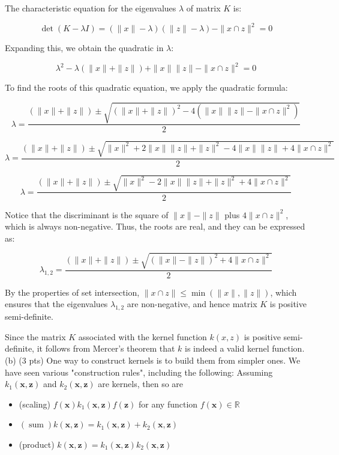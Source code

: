 \documentclass[10pt]{article}
\begin{document}
The characteristic equation for the eigenvalues $\lambda$ of matrix $K$ is:

\[
\det(K - \lambda I) = (\| x \| - \lambda)(\| z \| - \lambda) - \| x \cap z \|^2 = 0
\]

Expanding this, we obtain the quadratic in $\lambda$:

\[
\lambda^2 - \lambda(\| x \| + \| z \|) + \| x \|\| z \| - \| x \cap z \|^2 = 0
\]

To find the roots of this quadratic equation, we apply the quadratic formula:

\[
\lambda = \frac{(\| x \| + \| z \|) \pm \sqrt{(\| x \| + \| z \|)^2 - 4(\| x \|\| z \| - \| x \cap z \|^2)}}{2}
\]

\[
\lambda = \frac{(\| x \| + \| z \|) \pm \sqrt{\| x \|^2 + 2\| x \|\| z \| + \| z \|^2 - 4\| x \|\| z \| + 4\| x \cap z \|^2}}{2}
\]

\[
\lambda = \frac{(\| x \| + \| z \|) \pm \sqrt{\| x \|^2 - 2\| x \|\| z \| + \| z \|^2 + 4\| x \cap z \|^2}}{2}
\]

Notice that the discriminant is the square of $\| x \| - \| z \|$ plus $4\| x \cap z \|^2$, which is always non-negative. Thus, the roots are real, and they can be expressed as:

\[
\lambda_{1,2} = \frac{(\| x \| + \| z \|) \pm \sqrt{(\| x \| - \| z \|)^2 + 4\| x \cap z \|^2}}{2}
\]

By the properties of set intersection, $\| x \cap z \| \leq \min(\| x \|, \| z \|)$, which ensures that the eigenvalues $\lambda_{1,2}$ are non-negative, and hence matrix $K$ is positive semi-definite.

Since the matrix $K$ associated with the kernel function $k(x, z)$ is positive semi-definite, it follows from Mercer's theorem that $k$ is indeed a valid kernel function. \\

(b) (3 pts) One way to construct kernels is to build them from simpler ones. We have seen various "construction rules", including the following: Assuming $k_{1}(\boldsymbol{x}, \boldsymbol{z})$ and $k_{2}(\boldsymbol{x}, \boldsymbol{z})$ are kernels, then so are

\begin{itemize}
  \item (scaling) $f(\boldsymbol{x}) k_{1}(\boldsymbol{x}, \boldsymbol{z}) f(\boldsymbol{z})$ for any function $f(\boldsymbol{x}) \in \mathbb{R}$
  \item $(\operatorname{sum}) k(\boldsymbol{x}, \boldsymbol{z})=k_{1}(\boldsymbol{x}, \boldsymbol{z})+k_{2}(\boldsymbol{x}, \boldsymbol{z})$
  \item (product) $k(\boldsymbol{x}, \boldsymbol{z})=k_{1}(\boldsymbol{x}, \boldsymbol{z}) k_{2}(\boldsymbol{x}, \boldsymbol{z})$
\end{itemize}
\end{document}
